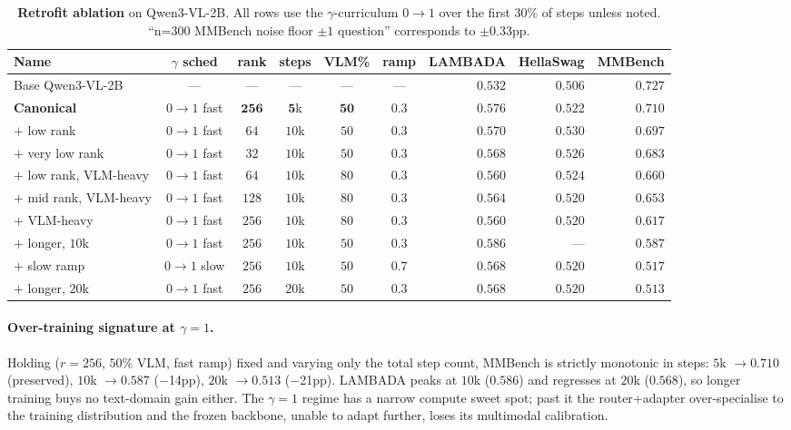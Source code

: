 \documentclass{article}
\begin{document}
\begin{table}[h]
\caption{\textbf{Retrofit ablation} on Qwen3-VL-2B. All rows use the $\gamma$-curriculum $0{\to}1$ over the first $30\%$ of steps unless noted. ``n=300 MMBench noise floor $\pm 1$ question'' corresponds to $\pm 0.33$pp.}
\label{tab:retrofit_ablation}
\centering\small
\begin{tabular}{lcccccrrr}
\toprule
Name & $\gamma$ sched & rank & steps & VLM\% & ramp & LAMBADA & HellaSwag & MMBench \\
\midrule
Base Qwen3-VL-2B & --- & --- & --- & --- & --- & $0.532$ & $0.506$ & $0.727$ \\
\midrule
\textbf{Canonical} & $0{\to}1$ fast & $\mathbf{256}$ & $\mathbf{5}$k & $\mathbf{50}$ & $\mathbf{0.3}$ & $\mathbf{0.576}$ & $\mathbf{0.522}$ & $\mathbf{0.710}$ \\
$+$ low rank      & $0{\to}1$ fast & $64$  & $10$k & $50$ & $0.3$ & $0.570$ & $0.530$ & $0.697$ \\
$+$ very low rank & $0{\to}1$ fast & $32$  & $10$k & $50$ & $0.3$ & $0.568$ & $0.526$ & $0.683$ \\
$+$ low rank, VLM-heavy & $0{\to}1$ fast & $64$  & $10$k & $80$ & $0.3$ & $0.560$ & $0.524$ & $0.660$ \\
$+$ mid rank, VLM-heavy & $0{\to}1$ fast & $128$ & $10$k & $80$ & $0.3$ & $0.564$ & $0.520$ & $0.653$ \\
$+$ VLM-heavy     & $0{\to}1$ fast & $256$ & $10$k & $80$ & $0.3$ & $0.560$ & $0.520$ & $0.617$ \\
$+$ longer, $10$k & $0{\to}1$ fast & $256$ & $10$k & $50$ & $0.3$ & $0.586$ & ---     & $0.587$ \\
$+$ slow ramp     & $0{\to}1$ slow & $256$ & $10$k & $50$ & $0.7$ & $0.568$ & $0.520$ & $0.517$ \\
$+$ longer, $20$k & $0{\to}1$ fast & $256$ & $20$k & $50$ & $0.3$ & $0.568$ & $0.520$ & $0.513$ \\
\bottomrule
\end{tabular}
\end{table}

\paragraph{Over-training signature at $\gamma{=}1$.} Holding ($r{=}256$, $50\%$ VLM, fast ramp) fixed and varying only the total step count, MMBench is strictly monotonic in steps: $5$k $\to 0.710$ (preserved), $10$k $\to 0.587$ ($-$14pp), $20$k $\to 0.513$ ($-$21pp). LAMBADA peaks at $10$k ($0.586$) and regresses at $20$k ($0.568$), so longer training buys no text-domain gain either. The $\gamma{=}1$ regime has a narrow compute sweet spot; past it the router+adapter over-specialise to the training distribution and the frozen backbone, unable to adapt further, loses its multimodal calibration.
\end{document}
